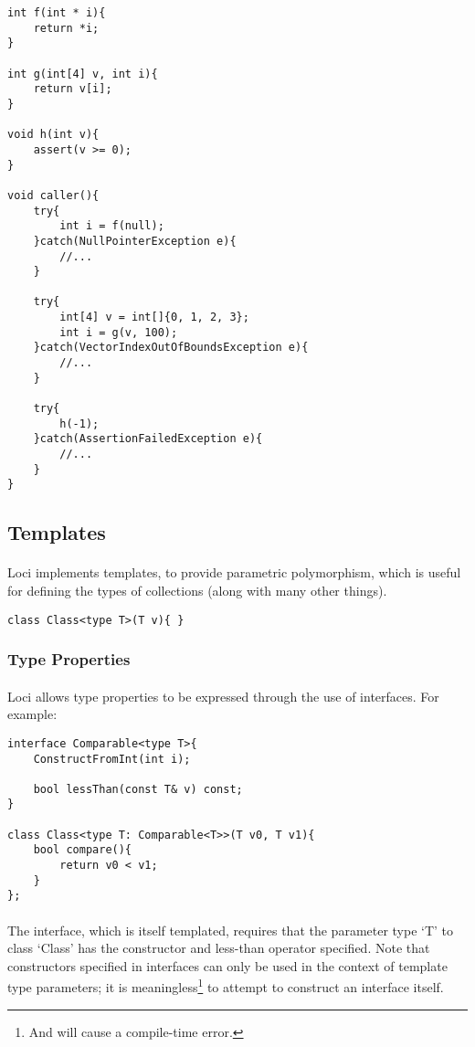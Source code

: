 \documentclass[12pt,twoside,notitlepage]{report}
\begin{document}
\begin{lstlisting}
int f(int * i){
	return *i;
}

int g(int[4] v, int i){
	return v[i];
}

void h(int v){
	assert(v >= 0);
}

void caller(){
	try{
		int i = f(null);
	}catch(NullPointerException e){
		//...
	}
	
	try{
		int[4] v = int[]{0, 1, 2, 3};
		int i = g(v, 100);
	}catch(VectorIndexOutOfBoundsException e){
		//...
	}
	
	try{
		h(-1);
	}catch(AssertionFailedException e){
		//...
	}
}
\end{lstlisting}


\clearpage

\subsection{Templates}

\paragraph{}
Loci implements templates, to provide parametric polymorphism, which is useful for defining the types of collections (along with many other things).


\begin{lstlisting}
class Class<type T>(T v){ }
\end{lstlisting}


\subsubsection{Type Properties}

\paragraph{}
Loci allows type properties to be expressed through the use of interfaces. For example:


\begin{lstlisting}
interface Comparable<type T>{
	ConstructFromInt(int i);

	bool lessThan(const T& v) const;
}

class Class<type T: Comparable<T>>(T v0, T v1){
	bool compare(){
		return v0 < v1;
	}
};
\end{lstlisting}


\paragraph{}
The interface, which is itself templated, requires that the parameter type `T' to class `Class' has the constructor and less-than operator specified. Note that constructors specified in interfaces can only be used in the context of template type parameters; it is meaningless\footnote{And will cause a compile-time error.} to attempt to construct an interface itself.
\end{document}
